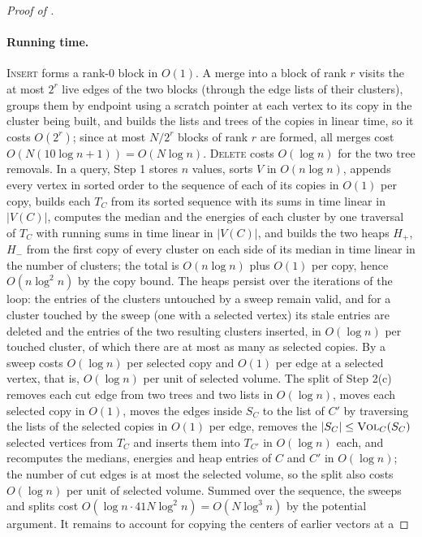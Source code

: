 \documentclass[11pt]{article}
\theoremstyle{remark}
\newcommand{\vol}{\textsc{Vol}}
\begin{document}
\begin{proof}[Proof of ]
\paragraph{Running time.}
\textsc{Insert} forms a rank-$0$ block in $O(1)$.
A merge into a block of rank $r$ visits the at most $2^{r}$ live edges of
the two blocks (through the edge lists of their clusters), groups them by
endpoint using a scratch pointer at each vertex to its copy in the cluster
being built, and builds the lists and trees of the copies in linear time,
so it costs $O(2^{r})$; since at most $N / 2^{r}$ blocks of rank $r$ are
formed, all merges cost $O(N (10 \log n + 1)) = O(N \log n)$.
\textsc{Delete} costs $O(\log n)$ for the two tree removals.
In a query, Step 1 stores $n$ values, sorts $V$ in $O(n \log n)$, appends
every vertex in sorted order to the sequence of each of its copies in
$O(1)$ per copy, builds each $T_C$ from its sorted sequence with its sums
in time linear in $|V(C)|$, computes the median and the energies of each
cluster by one traversal of $T_C$ with running sums in time linear in
$|V(C)|$, and builds the two heaps $H_{+}$, $H_{-}$ from the first copy of
every cluster on each side of its median in time linear in the number of
clusters; the total is $O(n \log n)$ plus $O(1)$ per copy, hence
$O(n \log^{2} n)$ by the copy bound.
The heaps persist over the iterations of the loop: the entries of the
clusters untouched by a sweep remain valid, and for a cluster touched by
the sweep (one with a selected vertex) its stale entries are deleted and the
entries of the two resulting clusters inserted, in $O(\log n)$ per touched
cluster, of which there are at most as many as selected copies.
By  a sweep costs $O(\log n)$ per selected copy and $O(1)$
per edge at a selected vertex, that is, $O(\log n)$ per unit of selected
volume.
The split of Step 2(c) removes each cut edge from two trees and two lists
in $O(\log n)$, moves each selected copy in $O(1)$, moves the edges inside
$S_C$ to the list of $C'$ by traversing the lists of the selected copies in
$O(1)$ per edge, removes the $|S_C| \le \vol_C(S_C)$ selected vertices from
$T_C$ and inserts them into $T_{C'}$ in $O(\log n)$ each, and recomputes
the medians, energies and heap entries of $C$ and $C'$ in $O(\log n)$;
the number of cut edges is at most the selected volume, so the split also
costs $O(\log n)$ per unit of selected volume.
Summed over the sequence, the sweeps and splits cost
$O(\log n \cdot 41 N \log^{2} n) = O(N \log^{3} n)$ by the potential
argument.
It remains to account for copying the centers of earlier vectors at a

\end{proof}
\end{document}
